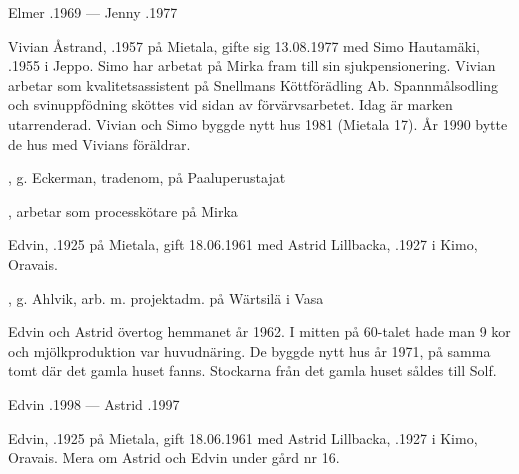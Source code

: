 Elmer .1969  ---  Jenny .1977



%



%
Vivian Åstrand, .1957 på Mietala, gifte sig 13.08.1977 med Simo Hautamäki, .1955 i Jeppo. Simo har arbetat på Mirka fram till sin sjukpensionering. Vivian arbetar som kvalitetsassistent på Snellmans Köttförädling Ab. Spannmålsodling och  svinuppfödning sköttes vid sidan av förvärvsarbetet. Idag är marken utarrenderad. Vivian och Simo byggde nytt hus 1981 (Mietala 17). År 1990 bytte de hus med Vivians föräldrar.
\begin{jhchildren}
  \item {}, g. Eckerman, tradenom, på Paaluperustajat
  \item {}, arbetar som processkötare på Mirka
\end{jhchildren}


%
Edvin, .1925 på Mietala, gift  18.06.1961 med Astrid Lillbacka, .1927 i Kimo, Oravais.
\begin{jhchildren}
  \item {}
  \item {}, g. Ahlvik, arb. m. projektadm. på Wärtsilä i Vasa
\end{jhchildren}

Edvin och Astrid övertog hemmanet år 1962. I mitten på 60-talet hade man 9 kor och mjölkproduktion var huvudnäring. De  byggde nytt hus år 1971, på samma tomt där det gamla huset fanns. Stockarna från det gamla huset såldes till Solf.

Edvin .1998  ---  Astrid .1997


%

%
Edvin, .1925 på Mietala, gift  18.06.1961 med Astrid Lillbacka, .1927 i Kimo, Oravais. Mera om Astrid och Edvin under gård nr 16.\jhvspace{}



